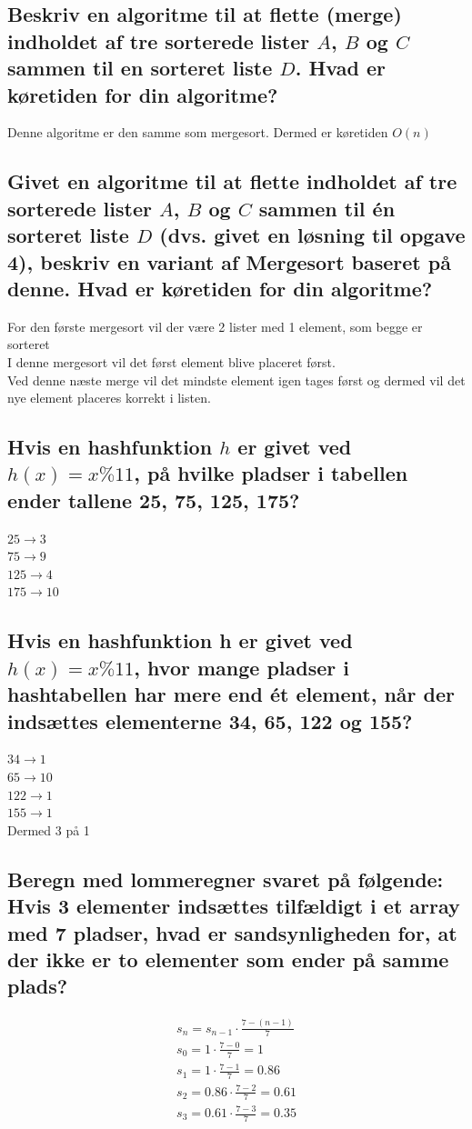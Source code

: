 \documentclass[12pt, a4paper]{article}
\begin{document}
		\subsection{Beskriv en algoritme til at flette (merge) indholdet af tre sorterede lister $A$, $B$ og $C$ sammen til en sorteret liste $D$. Hvad er køretiden for din algoritme?}
		Denne algoritme er den samme som mergesort. Dermed er køretiden $O(n)$
		\subsection{Givet en algoritme til at flette indholdet af tre sorterede lister $A$, $B$ og $C$ sammen til én sorteret liste $D$ (dvs. givet en løsning til opgave 4), beskriv en variant af Mergesort baseret på denne. Hvad er køretiden for din algoritme?}
			For den første mergesort vil der være 2 lister med 1 element, som begge er sorteret\\
			I denne mergesort vil det først element blive placeret først.\\
			Ved denne næste merge vil det mindste element igen tages først og dermed vil det nye element placeres korrekt i listen.
		\subsection{Hvis en hashfunktion $h$ er givet ved $h(x) = x \% 11$, på hvilke pladser i tabellen ender tallene 25, 75, 125, 175?}
			$25 \rightarrow 3$\\
			$75 \rightarrow 9$\\
			$125 \rightarrow 4$\\
			$175 \rightarrow 10$
		\subsection{Hvis en hashfunktion h er givet ved $h(x) = x \% 11$, hvor mange pladser i hashtabellen har mere end ét element, når der indsættes elementerne 34, 65, 122 og 155?}
			$34 \rightarrow 1$\\
			$65 \rightarrow 10$\\
			$122 \rightarrow 1$\\
			$155 \rightarrow 1$\\
			Dermed 3 på 1
		\subsection{Beregn med lommeregner svaret på følgende: Hvis 3 elementer indsættes tilfældigt i et array med 7 pladser, hvad er sandsynligheden for, at der ikke er to elementer som ender på samme plads?}
			\begin{align*}
				s_n=s_{n-1}\cdot \frac{7-(n-1)}{7}\\
				s_0=1\cdot \frac{7-0}{7}=1\\
				s_1=1\cdot \frac{7-1}{7}=0.86\\
				s_2=0.86\cdot \frac{7-2}{7}=0.61\\
				s_3=0.61\cdot \frac{7-3}{7}=0.35
			\end{align*}
\end{document}
